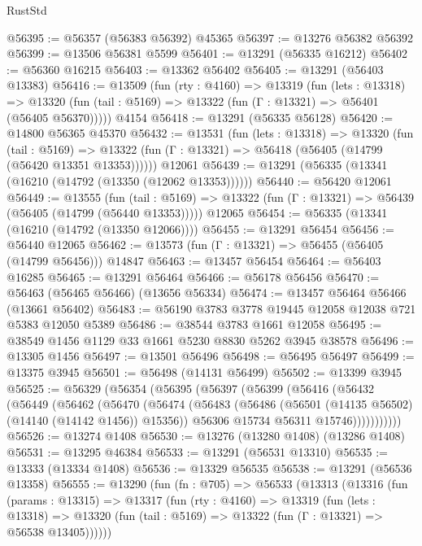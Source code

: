 \begin{lexlean}{RustStd}
\begin{coremodule}
@56395 := @56357 (@56383 @56392) @45365
@56397 := @13276 @56382 @56392
@56399 := @13506 @56381 @5599
@56401 := @13291 (@56335 @16212)
@56402 := @56360 @16215
@56403 := @13362 @56402
@56405 := @13291 (@56403 @13383)
@56416 := @13509
    (fun (rty : @4160) =>
    @13319
      (fun (lets : @13318) =>
      @13320 (fun (tail : @5169) => @13322 (fun (Γ : @13321) => @56401 (@56405 @56370)))))
    @4154
@56418 := @13291 (@56335 @56128)
@56420 := @14800 @56365 @45370
@56432 := @13531
    (fun (lets : @13318) =>
    @13320
      (fun (tail : @5169) =>
      @13322 (fun (Γ : @13321) => @56418 (@56405 (@14799 (@56420 @13351 @13353))))))
    @12061
@56439 := @13291 (@56335 (@13341 (@16210 (@14792 (@13350 (@12062 @13353))))))
@56440 := @56420 @12061
@56449 := @13555
    (fun (tail : @5169) => @13322 (fun (Γ : @13321) => @56439 (@56405 (@14799 (@56440 @13353)))))
    @12065
@56454 := @56335 (@13341 (@16210 (@14792 (@13350 @12066))))
@56455 := @13291 @56454
@56456 := @56440 @12065
@56462 := @13573 (fun (Γ : @13321) => @56455 (@56405 (@14799 @56456))) @14847
@56463 := @13457 @56454
@56464 := @56403 @16285
@56465 := @13291 @56464
@56466 := @56178 @56456
@56470 := @56463 (@56465 @56466) (@13656 @56334)
@56474 := @13457 @56464 @56466 (@13661 @56402)
@56483 := @56190 @3783 @3778 @19445 @12058 @12038 @721 @5383 @12050 @5389
@56486 := @38544 @3783 @1661 @12058
@56495 := @38549 @1456 @1129 @33 @1661 @5230 @8830 @5262 @3945 @38578
@56496 := @13305 @1456
@56497 := @13501 @56496
@56498 := @56495 @56497
@56499 := @13375 @3945
@56501 := @56498 (@14131 @56499)
@56502 := @13399 @3945
@56525 := @56329
    (@56354
      (@56395
        (@56397
          (@56399
            (@56416
              (@56432
                (@56449
                  (@56462
                    (@56470
                      (@56474
                        (@56483
                          (@56486 (@56501 (@14135 @56502) (@14140 (@14142 @1456)) @15356))
                          @56306
                          @15734
                          @56311
                          @15746)))))))))))
@56526 := @13274 @1408
@56530 := @13276 (@13280 @1408) (@13286 @1408)
@56531 := @13295 @46384
@56533 := @13291 (@56531 @13310)
@56535 := @13333 (@13334 @1408)
@56536 := @13329 @56535
@56538 := @13291 (@56536 @13358)
@56555 := @13290
    (fun (fn : @705) =>
    @56533
      (@13313
        (@13316
          (fun (params : @13315) =>
          @13317
            (fun (rty : @4160) =>
            @13319
              (fun (lets : @13318) =>
              @13320 (fun (tail : @5169) => @13322 (fun (Γ : @13321) => @56538 @13405))))))

\end{coremodule}
\end{lexlean}
